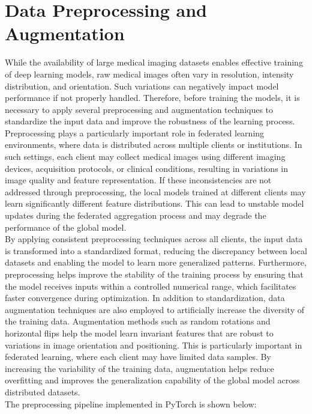 \documentclass[12pt]{book}
\begin{document}
\section{Data Preprocessing and Augmentation}
While the availability of large medical imaging datasets enables effective training of deep learning models, raw medical images often vary in resolution, intensity distribution, and orientation. Such variations can negatively impact model performance if not properly handled. Therefore, before training the models, it is necessary to apply several preprocessing and augmentation techniques to standardize the input data and improve the robustness of the learning process.
Preprocessing plays a particularly important role in federated learning environments, where data is distributed across multiple clients or institutions. In such settings, each client may collect medical images using different imaging devices, acquisition protocols, or clinical conditions, resulting in variations in image quality and feature representation. If these inconsistencies are not addressed through preprocessing, the local models trained at different clients may learn significantly different feature distributions. This can lead to unstable model updates during the federated aggregation process and may degrade the performance of the global model.\\
By applying consistent preprocessing techniques across all clients, the input data is transformed into a standardized format, reducing the discrepancy between local datasets and enabling the model to learn more generalized patterns. Furthermore, preprocessing helps improve the stability of the training process by ensuring that the model receives inputs within a controlled numerical range, which facilitates faster convergence during optimization.
In addition to standardization, data augmentation techniques are also employed to artificially increase the diversity of the training data. Augmentation methods such as random rotations and horizontal flips help the model learn invariant features that are robust to variations in image orientation and positioning. This is particularly important in federated learning, where each client may have limited data samples. By increasing the variability of the training data, augmentation helps reduce overfitting and improves the generalization capability of the global model across distributed datasets.\\


The preprocessing pipeline implemented in PyTorch is shown below:
\end{document}
